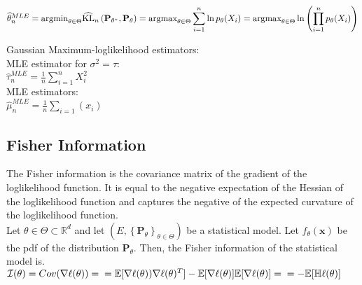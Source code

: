 $\widehat{\theta }_ n^{MLE} =\\ \displaystyle \text {argmin}_{\theta \in \Theta }\widehat{\text {KL}}_ n\left(\mathbf{P}_{\theta ^*}, \mathbf{P}_{\theta }\right) =\\ \displaystyle \text {argmax}_{\theta \in \Theta } \sum _{i=1}^{n} \ln p_{\theta }(X_ i) =\\  \displaystyle \text {argmax}_{\theta \in \Theta } \ln \left(\prod _{i=1}^{n} p_{\theta }(X_ i)\right)$

Gaussian Maximum-loglikelihood estimators:\\

 MLE estimator for $\sigma^2 = \tau$:\\  
$\hat{\tau }_ n^{MLE} = \frac{1}{n} \sum _{i = 1}^ n X_ i^2$\\

MLE estimators:\\

$\hat{\mu}_ n^{MLE}=\frac{1}{n}\sum_{i=1}(x_i)$


\subsection{Fisher Information}

The Fisher information is the covariance matrix of the gradient of the loglikelihood function. It is equal to the negative expectation of the Hessian of the loglikelihood function and captures the negative of the expected curvature of the loglikelihood function.\\

Let $\theta \in \Theta \subset \mathbb {R}^ d$ and let $\left(E,\left\{ \mathbf{P}_\theta \right\} _{\theta \in \Theta }\right)$ be a statistical model. Let $f_{\theta }(\mathbf x)$ be the pdf of the distribution $\mathbf{P}_\theta$. Then, the Fisher information of the statistical model is.\\

$\mathcal{I}(\theta) = Cov(\nabla \ell(\theta)) = \\ = \mathbb{E}[\nabla \ell(\theta))\nabla\ell(\theta)^T] -  \mathbb{E}[\nabla \ell(\theta)]\mathbb{E}[\nabla \ell(\theta)] =\\ = -\mathbb{E}[\mathbb{H}\ell(\theta)]$\\

